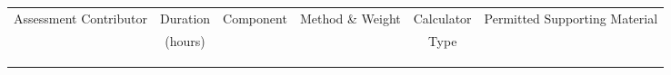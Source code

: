 \documentclass[11pt]{eie-cbo}
\begin{document}

\begin{table}[ht]\small\centering
\begin{tabular}{lccccl}\toprule
\multirow{2}{2cm}{Assessment Contributor}  & Duration & Component & \multirow{2}{1.5cm}{Method \& Weight} & Calculator & \multirow{2}{3.5cm}{Permitted Supporting Material}\\ 
 & (hours) & & & Type &  \\
\midrule
 &   &  &  &  &   \\
 &   &  &  &  &   \\
 &   &  &  &  &   \\
\bottomrule
\end{tabular}\label{tab:sum-contributors}
\end{table}





\end{document}
